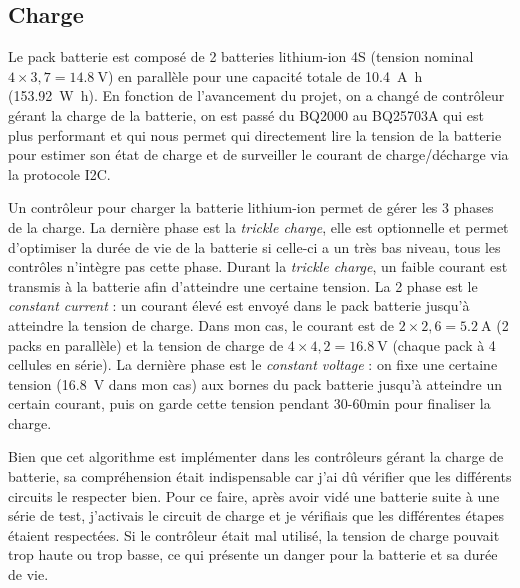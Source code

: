 \documentclass[a4paper, 11pt]{report}
\begin{document}
\subsection{Charge}
Le pack batterie est composé de 2 batteries lithium-ion 4S (tension nominal $4\times3,7=\SI{14.8}{\volt}$) en parallèle pour une capacité totale de \SI{10.4}{\ampere\hour} (\SI{153.92}{\watt\hour}). En fonction de l’avancement du projet, on a changé de contrôleur gérant la charge de la batterie, on est passé du BQ2000 au BQ25703A qui est plus performant et qui nous permet qui directement lire la tension de la batterie pour estimer son état de charge et de surveiller le courant de charge/décharge via la protocole I2C.

Un contrôleur pour charger la batterie lithium-ion permet de gérer les 3 phases de la charge. La dernière phase est la \emph{trickle charge}, elle est optionnelle et permet d’optimiser la durée de vie de la batterie si celle-ci a un très bas niveau, tous les contrôles n’intègre pas cette phase. Durant la \emph{trickle charge}, un faible courant est transmis à la batterie afin d’atteindre une certaine tension. La 2\ieme{} phase est le \emph{constant current} : un courant élevé est envoyé dans le pack batterie jusqu’à atteindre la tension de charge. Dans mon cas, le courant est de $2\times2,6 = \SI{5.2}{\ampere}$ (2 packs en parallèle) et la tension de charge de $4\times4,2 = \SI{16.8}{\volt}$ (chaque pack à 4 cellules en série). La dernière phase est le \emph{constant voltage} : on fixe une certaine tension (\SI{16.8}{\volt} dans mon cas) aux bornes du pack batterie jusqu’à atteindre un certain courant, puis on garde cette tension pendant 30-60min pour finaliser la charge.

Bien que cet algorithme est implémenter dans les contrôleurs gérant la charge de batterie, sa compréhension était indispensable car j'ai dû vérifier que les différents circuits le respecter bien. Pour ce faire, après avoir vidé une batterie suite à une série de test, j'activais le circuit de charge et je vérifiais que les différentes étapes étaient respectées. Si le contrôleur était mal utilisé, la tension de charge pouvait trop haute ou trop basse, ce qui présente un danger pour la batterie et sa durée de vie.
\end{document}
